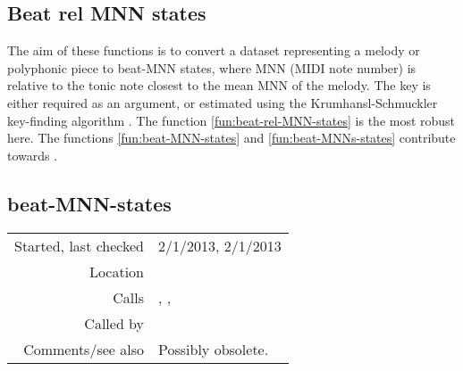 \subsection{Beat rel MNN states}\label{sec:beat-rel-MNN-states}

 The aim of these functions is to convert a
dataset representing a melody or polyphonic piece to
beat-MNN states, where MNN (MIDI note number) is
relative to the tonic note closest to the mean MNN of
the melody. The key is either required as an
argument, or estimated using the Krumhansl-Schmuckler
key-finding algorithm \citep{krumhansl1990}. The
function \ref{fun:beat-rel-MNN-states} is the most
robust here. The functions \ref{fun:beat-MNN-states}
and \ref{fun:beat-MNNs-states} contribute towards
\cite{collins2012}.


\subsection*{beat-MNN-states}\label{fun:beat-MNN-states}

\vspace{0.3cm}
\begin{tabular}{r|p{8cm}}
Started, last checked & 2/1/2013, 2/1/2013 \\
Location & \nameref{sec:beat-rel-MNN-states} \\
Calls & \nameref{fun:centre-dataset}, \nameref{fun:fifths-step-mode2MNN-MPN}, \nameref{fun:segments-strict} \\
Called by & \\
Comments/see also & Possibly obsolete.
\end{tabular}

